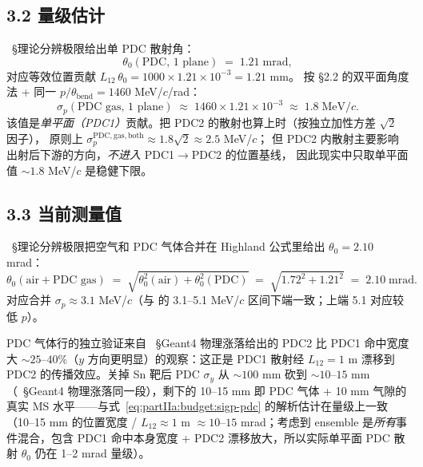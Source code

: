 \subsection*{3.2 量级估计}

\StatusReport{}~§理论分辨极限给出单 PDC 散射角：
\begin{equation}
  \theta_0(\text{PDC, 1 plane}) \;=\; 1.21\;\mathrm{mrad},
  \label{eq:partIIa:budget:theta-pdc}
\end{equation}
对应等效位置贡献 $L_{12}\,\theta_0 = 1000\times 1.21\times 10^{-3} = 1.21$ mm。
按 §2.2 的双平面角度法 + 同一 $p/\theta_\mathrm{bend}=1460$ MeV/$c$/rad：
\begin{equation}
  \sigma_p(\text{PDC gas, 1 plane}) \;\approx\;
     1460 \times 1.21\times 10^{-3}
     \;\approx\; 1.8\;\mathrm{MeV}/c.
  \label{eq:partIIa:budget:sigp-pdc}
\end{equation}
该值是\emph{单平面（PDC1）}贡献。把 PDC2 的散射也算上时（按独立加性方差 $\sqrt 2$ 因子），
原则上 $\sigma_p^\mathrm{PDC,gas, both} \approx 1.8\sqrt 2 \approx 2.5$ MeV/$c$；
但 PDC2 内散射主要影响出射后下游的方向，\emph{不进入} PDC1$\to$PDC2 的位置基线，
因此现实中只取单平面值 $\sim 1.8$ MeV/$c$ 是稳健下限。

\subsection*{3.3 当前测量值}

\StatusReport{}~§理论分辨极限把空气和 PDC 气体合并在 Highland 公式里给出 $\theta_0 = 2.10$ mrad：
\begin{equation}
  \theta_0(\text{air} + \text{PDC gas}) \;=\;\sqrt{\theta_0^2(\text{air})+\theta_0^2(\text{PDC})}
       \;=\;\sqrt{1.72^2 + 1.21^2}\;=\;2.10\;\mathrm{mrad}.
  \label{eq:partIIa:budget:theta-combined}
\end{equation}
对应合并 $\sigma_p \approx 3.1$ MeV/$c$（与 \StatusReport{} 的 3.1--5.1 MeV/$c$ 区间下端一致；上端 5.1 对应较低 $p$）。

PDC 气体行的独立验证来自 \StatusReport{}~§Geant4 物理涨落给出的 PDC2 比 PDC1 命中宽度大 $\sim 25$--$40\%$（$y$ 方向更明显）的观察：这正是 PDC1 散射经 $L_{12}=1$ m 漂移到 PDC2 的传播效应。关掉 Sn 靶后 PDC $\sigma_y$ 从 $\sim 100$ mm 砍到 $\sim 10$--$15$ mm（\StatusReport{}~§Geant4 物理涨落同一段），剩下的 10--15 mm 即 PDC 气体 + 10 mm 气隙的真实 MS 水平——与式~\eqref{eq:partIIa:budget:sigp-pdc} 的解析估计在量级上一致（10--15 mm 的位置宽度 / $L_{12}\approx 1$ m $\approx 10$--$15$ mrad；考虑到 ensemble 是\emph{所有}事件混合，包含 PDC1 命中本身宽度 + PDC2 漂移放大，所以实际单平面 PDC 散射 $\theta_0$ 仍在 1--2 mrad 量级）。

